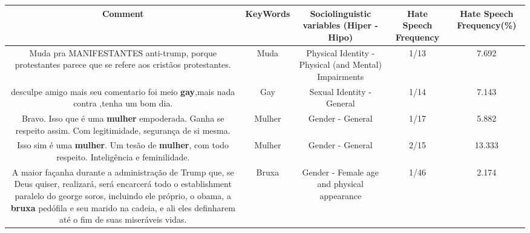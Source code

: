 \documentclass[11pt]{article}
\newlength\mylength
\begin{document}
\begin{center}
\setlength\mylength{\dimexpr\textwidth - 1\arrayrulewidth - 50\tabcolsep}
\begin{longtable}{|C{.65\mylength}|C{.30\mylength}|C{.12\mylength}|C{.12\mylength}|C{.12\mylength}|}
\hline
\textbf{Comment} & \textbf{KeyWords} & \textbf{Sociolinguistic variables (Hiper - Hipo)}  & \textbf{Hate Speech Frequency} & \textbf{Hate Speech Frequency(\%)} \\
\hline{}\small Muda pra MANIFESTANTES anti-trump, porque protestantes parece que se refere aos cristãos protestantes.\normalsize   & Muda & Physical Identity - Physical (and Mental) Impairments & 1/13 & 7.692 \\  \hline
  \small desculpe amigo mais seu comentario foi meio \textbf{gay},mais nada contra ,tenha um bom dia.\normalsize   & Gay & Sexual Identity - General & 1/14 & 7.143 \\  \hline
  \small Bravo. Isso que é uma \textbf{mulher} empoderada. Ganha se respeito assim. Com legitimidade, segurança de si mesma.\normalsize   & Mulher & Gender - General & 1/17 & 5.882 \\  \hline
  \small Isso sim é uma \textbf{mulher}. Um tesão de \textbf{mulher}, com todo respeito. Inteligência e feminilidade.\normalsize   & Mulher & Gender - General & 2/15 & 13.333 \\  \hline
  \small A maior façanha durante a administração de Trump que, se Deus quiser, realizará, será encarcerá todo o establishment paralelo do george soros, incluindo ele próprio, o obama, a \textbf{bruxa} pedófila e seu marido na cadeia, e ali eles definharem até o fim de suas miseráveis vidas.\normalsize   & Bruxa & Gender - Female age and physical appearance & 1/46 & 2.174 \\  \hline
  
\end{longtable}
\end{center}
\end{document}
